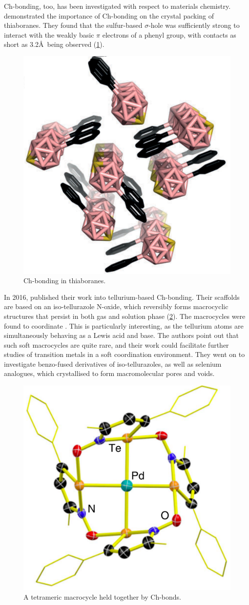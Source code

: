 \begin{refsection}
Ch-bonding, too, has been investigated with respect to materials chemistry.
\citeauthor{Fanfrlik2014} demonstrated the importance of Ch-bonding on the crystal packing of thiaboranes.\autocite{Fanfrlik2014}
They found that the sulfur-based $\sigma$-hole was sufficiently strong to interact with the weakly basic $\pi$ electrons of a phenyl group, with contacts as short as 3.2\AA~being observed (\cref{fig:thiaborane-ch-bond}).

\begin{figure}
    \centering
    \includegraphics[width=0.45\linewidth]{Figures/thiaborane-ch-bond.pdf}
    \caption{Ch-bonding in thiaboranes.\autocite{Fanfrlik2014}}
    \label{fig:thiaborane-ch-bond}
\end{figure}

In 2016, \citeauthor{Ho2016} published their work into tellurium-based Ch-bonding.\autocite{Ho2016}
Their scaffolds are based on an iso-tellurazole N-oxide, which reversibly forms macrocyclic structures that persist in both gas and solution phase (\cref{fig:te-pd-macrocycle}).
The macrocycles were found to coordinate .
This is particularly interesting, as the tellurium atoms are simultaneously behaving as a Lewis acid and base.
The authors point out that such soft macrocycles are quite rare, and their work could facilitate further studies of transition metals in a soft coordination environment.
They went on to investigate benzo-fused derivatives of iso-tellurazoles, as well as selenium analogues, which crystallised to form macromolecular pores and voids.\autocite{Ho2017}

\begin{figure}
    \centering
    \includegraphics[width=0.4\linewidth]{Figures/te-pd-macrocycle.pdf}
    \caption{A tetrameric macrocycle held together by Ch-bonds.\autocite{Ho2016}}
    \label{fig:te-pd-macrocycle}
\end{figure}


\end{refsection}
